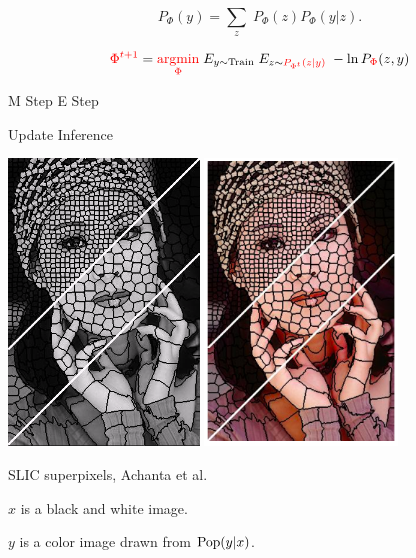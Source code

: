 {\vfill
{\color{red} $$P_\Phi(y) = \sum_z\;P_\Phi(z)P_\Phi(y|z).$$}

\vfill
$${\color{red} \Phi^{t+1}} =  {\color{red} \operatorname*{argmin}_\Phi}\;E_{y \sim \mathrm{Train}} \;E_{z \sim {\color{red} P_{\Phi^t}(z|y)}}\; - \ln P_{\color{red} \Phi}(z,y)$$
\centerline{M Step \hspace{6em} E Step \hspace{2.5em}~}
\centerline{\hspace{1em} Update \hspace{6em} Inference \hspace{2.5em}~}


\centerline{\includegraphics[height = 3in]{../images/SLIC} \hspace{.5in} \includegraphics[height = 3in]{../images/SLICcolor}}
\centerline{\huge SLIC superpixels, Achanta et al.}

$x$ is a black and white image.

\vfill
$y$ is a color image drawn from $\mathrm{Pop}(y|x)$.

}
